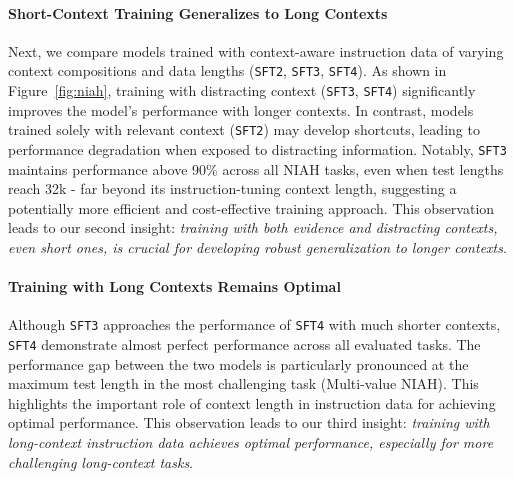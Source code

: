 \noindent\paragraph{Short-Context Training Generalizes to Long Contexts}
Next, we compare models trained with context-aware instruction data of varying context compositions and data lengths (\texttt{SFT2}, \texttt{SFT3}, \texttt{SFT4}).
As shown in Figure~\ref{fig:niah}, training with distracting context (\texttt{SFT3}, \texttt{SFT4}) significantly improves the model's performance with longer contexts.
In contrast, models trained solely with relevant context (\texttt{SFT2}) may develop shortcuts, leading to performance degradation when exposed to distracting information. 
Notably, \texttt{SFT3} maintains performance above 90\% across all NIAH tasks, even when test lengths reach 32k - far beyond its instruction-tuning context length, suggesting a potentially more efficient and cost-effective training approach.
This observation leads to our second insight: \textit{training with both evidence and distracting contexts, even short ones, is crucial for developing robust generalization to longer contexts}.

\noindent\paragraph{Training with Long Contexts Remains Optimal}
Although \texttt{SFT3} approaches the performance of \texttt{SFT4} with much shorter contexts, \texttt{SFT4} demonstrate almost perfect performance across all evaluated tasks.
The performance gap between the two models is particularly pronounced at the maximum test length in the most challenging task (Multi-value NIAH).
This highlights the important role of context length in instruction data for achieving optimal performance.
This observation leads to our third insight: \textit{training with long-context instruction data achieves optimal performance, especially for more challenging long-context tasks}.